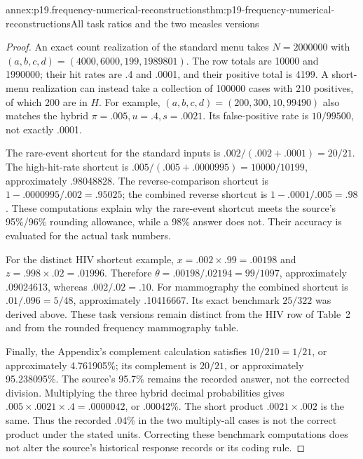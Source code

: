 \begin{annexitem}{annex:p19.frequency-numerical-reconstructions}{thm:p19-frequency-numerical-reconstructions}{All task ratios and the two measles versions}
\begin{proof}
An exact count realization of the standard menu takes \(N=2000000\)
with \((a,b,c,d)=(4000,6000,199,1989801)\). The row totals are
10000 and 1990000; their hit rates are .4 and .0001, and their positive
total is 4199. A short-menu realization can instead take a collection
of 100000 cases with 210 positives, of which 200 are in \(H\). For
example, \((a,b,c,d)=(200,300,10,99490)\) also matches the hybrid
\(\pi=.005,u=.4,s=.0021\). Its false-positive rate is
\(10/99500\), not exactly .0001.

The rare-event shortcut for the standard inputs is
\(.002/(.002+.0001)=20/21\). The high-hit-rate shortcut is
\(.005/(.005+.0000995)=10000/10199\), approximately .98048828.
The reverse-comparison shortcut is
\(1-.0000995/.002=.95025\); the combined reverse shortcut is
\(1-.0001/.005=.98\). These computations explain why the rare-event
shortcut meets the source's 95\%/96\% rounding allowance, while a 98\%
answer does not. Their accuracy is evaluated for the actual task numbers.

For the distinct HIV shortcut example, \(x=.002\times.99=.00198\)
and \(z=.998\times.02=.01996\). Therefore
\(\theta=.00198/.02194=99/1097\), approximately .09024613, whereas
\(.002/.02=.10\). For mammography the combined shortcut is
\(.01/.096=5/48\), approximately .10416667. Its exact benchmark
\(25/322\) was derived above. These task versions remain distinct from
the HIV row of Table~2 and from the rounded frequency mammography table.

Finally, the Appendix's complement calculation satisfies
\(10/210=1/21\), or approximately 4.761905\%; its complement is
\(20/21\), or approximately 95.238095\%. The source's 95.7\% remains
the recorded answer, not the corrected division. Multiplying the three
hybrid decimal probabilities gives
\(.005\times.0021\times.4=.0000042\), or .00042\%.
The short product \(.0021\times.002\) is the same. Thus the recorded
.04\% in the two multiply-all cases is not the correct product under
the stated units. Correcting these benchmark computations does not alter
the source's historical response records or its coding rule.
\end{proof}
\end{annexitem}
